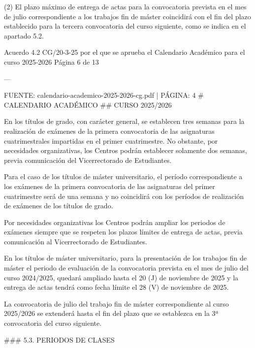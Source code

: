\documentclass{article}
\begin{document}
\begin{itemize}
\begin{itemize}
\begin{scriptsize}
                  (2) El plazo máximo de entrega de actas para la convocatoria prevista en el mes de julio correspondiente a los trabajos fin de máster coincidirá con el fin del plazo establecido para la tercera convocatoria del curso siguiente, como se indica en el apartado 5.2.

                  Acuerdo 4.2 CG/20-3-25 por el que se aprueba el Calendario Académico para el curso 2025-2026  Página 6 de 13

                  ---

                  FUENTE: calendario-academico-2025-2026-cg.pdf | PÁGINA: 4
                  \# CALENDARIO ACADÉMICO
                  \#\# CURSO 2025/2026

                  En los títulos de grado, con carácter general, se establecen tres semanas para la realización de exámenes de la primera convocatoria de las asignaturas cuatrimestrales impartidas en el primer cuatrimestre. No obstante, por necesidades organizativas, los Centros podrán establecer solamente dos semanas, previa comunicación del Vicerrectorado de Estudiantes.

                  Para el caso de los títulos de máster universitario, el período correspondiente a los exámenes de la primera convocatoria de las asignaturas del primer cuatrimestre será de una semana y no coincidirá con los períodos de realización de exámenes de los títulos de grado.

                  Por necesidades organizativas los Centros podrán ampliar los periodos de exámenes siempre que se respeten los plazos límites de entrega de actas, previa comunicación al Vicerrectorado de Estudiantes.

                  En los títulos de máster universitario, para la presentación de los trabajos fin de máster el periodo de evaluación de la convocatoria prevista en el mes de julio del curso 2024/2025, quedará ampliado hasta el 20 (J) de noviembre de 2025 y la entrega de actas tendrá como fecha límite el 28 (V) de noviembre de 2025.

                  La convocatoria de julio del trabajo fin de máster correspondiente al curso 2025/2026 se extenderá hasta el fin del plazo que se establezca en la 3ª convocatoria del curso siguiente.

                  \#\#\# 5.3. PERIODOS DE CLASES


\end{scriptsize}
\end{itemize}
\end{itemize}
\end{document}
